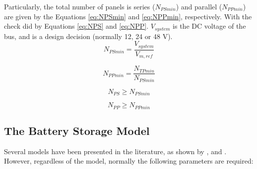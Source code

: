 \documentclass[journal]{IEEEtran}
\begin{document}
Particularly, the total number of panels is series ($ N_{PSmin} $) and parallel ($ N_{PPmin} $) are given by the Equations \ref{eq:NPSmin} and \ref{eq:NPPmin}, respectively. With the check did by Equations \ref{eq:NPS} and \ref{eq:NPP}. $ V_{system} $ is the DC voltage of the bus, and is a design decision (normally 12, 24 or 48 V).
\begin{equation}
\label{eq:NPSmin}
N_{PSmin} = \dfrac{V_{system}}{V_{m,ref}}
\end{equation}

\begin{equation}
\label{eq:NPPmin}
N_{PPmin} = \dfrac{N_{TPmin}}{N_{PSmin}}
\end{equation}

\begin{equation}
\label{eq:NPS}
N_{PS} \geq N_{PSmin}
\end{equation}

\begin{equation}
\label{eq:NPP}
N_{PP} \geq N_{PPmin}
\end{equation}


\subsection{The Battery Storage Model }
  
Several models have been presented in the literature, as shown by \cite{Copetti}, and \cite{Manwell93}.
However, regardless of the model, normally the following parameters are required: 
\end{document}
